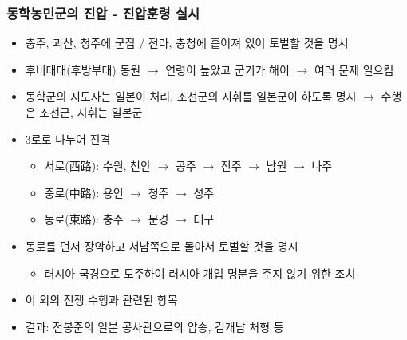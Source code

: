 \subsubsection*{동학농민군의 진압 - 진압훈령 실시}
\begin{itemize}
    \item 충주, 괴산, 청주에 군집 / 전라, 충청에 흩어져 있어 토벌할 것을 명시
    \item 후비대대(후방부대) 동원 $\rightarrow$ 연령이 높았고 군기가 해이 $\rightarrow$ 여러 문제 일으킴
    \item 동학군의 지도자는 일본이 처리, 조선군의 지휘를 일본군이 하도록 명시 $\rightarrow$ 수행은 조선군, 지휘는 일본군
    \item 3로로 나누어 진격
    \begin{itemize}
        \item 서로(西路): 수원, 천안 $\rightarrow$ 공주 $\rightarrow$ 전주 $\rightarrow$ 남원 $\rightarrow$ 나주
        \item 중로(中路): 용인 $\rightarrow$ 청주 $\rightarrow$ 성주
        \item 동로(東路): 충주 $\rightarrow$ 문경 $\rightarrow$ 대구
    \end{itemize}
    \item 동로를 먼저 장악하고 서남쪽으로 몰아서 토벌할 것을 명시
    \begin{itemize}
        \item 러시아 국경으로 도주하여 러시아 개입 명분을 주지 않기 위한 조치
    \end{itemize}
    \item 이 외의 전쟁 수행과 관련된 항목
    \item 결과: 전봉준의 일본 공사관으로의 압송, 김개남 처형 등
\end{itemize}

